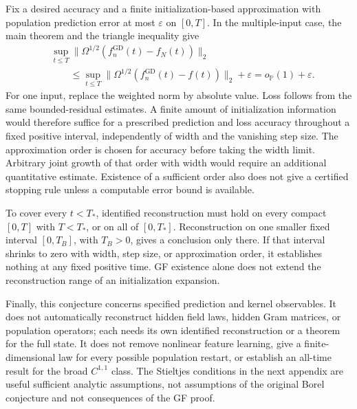 Fix a desired accuracy and a finite initialization-based approximation with
population prediction error at most $\varepsilon$ on $[0,T]$.  In the
multiple-input case, the main theorem and the triangle inequality give
\begin{align*}
 &\sup_{t\le T}\|\Omega^{1/2}(f_n^{\mathrm{GD}}(t)-f_N(t))\|_2\\
 &\qquad\le
 \sup_{t\le T}\|\Omega^{1/2}(f_n^{\mathrm{GD}}(t)-f(t))\|_2
 +\varepsilon
 =o_{\mathbb P}(1)+\varepsilon.
\end{align*}
For one input, replace the weighted norm by absolute value.  Loss follows
from the same bounded-residual estimates.  A finite amount of initialization
information would therefore suffice for a prescribed prediction and loss
accuracy throughout a fixed positive interval, independently of width and
the vanishing step size.  The approximation order is chosen for accuracy
before taking the width limit.  Arbitrary joint growth of that order with
width would require an additional quantitative estimate.  Existence of a
sufficient order also does not give a certified stopping rule unless a
computable error bound is available.

To cover every $t<T_*$, identified reconstruction must hold on every compact
$[0,T]$ with $T<T_*$, or on all of $[0,T_*]$.  Reconstruction on one smaller
fixed interval $[0,T_B]$, with $T_B>0$, gives a conclusion only there.  If
that interval shrinks to zero with width, step size, or approximation order,
it establishes nothing at any fixed positive time.  GF existence alone
does not extend the reconstruction range of an initialization expansion.

Finally, this conjecture concerns specified prediction and kernel
observables.  It does not automatically reconstruct hidden field laws,
hidden Gram matrices, or population operators; each needs its own identified
reconstruction or a theorem for the full state.  It does not remove nonlinear
feature learning, give a finite-dimensional law for every possible
population restart, or establish an all-time result for the broad
$C^{1,1}$ class.  The Stieltjes conditions in the next appendix are useful
sufficient analytic assumptions, not assumptions of the original Borel
conjecture and not consequences of the GF proof.
